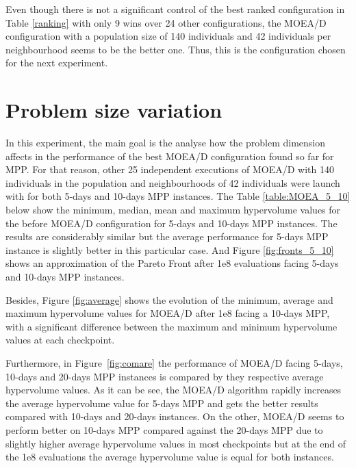 Even though there is not a significant control of the best ranked configuration in Table \ref{ranking} with only 9 wins over 24 other configurations, the MOEA/D configuration with a population size of 140 individuals and 42 individuals per neighbourhood seems to be the better one. Thus, this is the configuration chosen for the next experiment.


\newpage

\section{Problem size variation}
In this experiment, the main goal is the analyse how the problem dimension affects in the performance of the best MOEA/D configuration found so far for MPP. For that reason, other 25 independent executions of MOEA/D with 140 individuals in the population and neighbourhoods of 42 individuals were launch with for both 5-days and 10-days MPP instances. The Table \ref{table:MOEA_5_10} below show the minimum, median, mean and maximum hypervolume values for the before MOEA/D configuration for 5-days and 10-days MPP instances. The results are considerably similar but the average performance for 5-days MPP instance is slightly better in this particular case. And Figure \ref{fig:fronts_5_10} shows an approximation of the Pareto Front after 1e8 evaluations facing 5-days and 10-days MPP instances.



Besides, Figure \ref{fig:average} shows the evolution of the minimum, average and maximum hypervolume values for MOEA/D after 1e8 facing a 10-days MPP, with a significant difference between the maximum and minimum hypervolume values at each checkpoint.

Furthermore, in Figure~\ref{fig:comare} the performance of MOEA/D facing 5-days, 10-days and 20-days MPP instances is compared by they respective average hypervolume values. As it can be see, the MOEA/D algorithm rapidly increases the average hypervolume value for 5-days MPP and gets the better results compared with 10-days and 20-days instances. On the other, MOEA/D seems to perform better on 10-days MPP compared against the 20-days MPP due to slightly higher average hypervolume values in most checkpoints but at the end of the 1e8 evaluations the average hypervolume value is equal for both instances.

